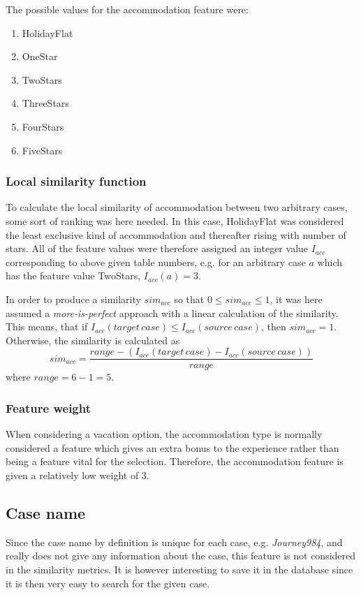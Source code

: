 \documentclass[12pt]{article}
\begin{document}
The possible values for the accommodation feature were: 

\begin{enumerate}
\item HolidayFlat
\item OneStar
\item TwoStars
\item ThreeStars
\item FourStars
\item FiveStars
\end{enumerate}

\subsubsection{Local similarity function}

To calculate the local similarity of accommodation between two arbitrary cases, some sort of ranking was here needed. 
In this case, HolidayFlat was considered the least exclusive kind of accommodation and thereafter rising with number of stars. All of the feature values were therefore assigned an integer value $I_{acc}$ corresponding to above given table numbers, e.g. for an arbitrary case $a$ which has the feature value TwoStars, $I_{acc}(a)=3$. 

In order to produce a similarity $sim_{acc}$ so that $0 \leq sim_{acc} \leq 1$, it was here assumed a \textit{more-is-perfect} approach with a linear calculation of the similarity. This means, that if $I_{acc}(target\,case) \leq I_{acc}(source\,case)$, then $sim_{acc}=1$. Otherwise, the similarity is calculated as $$sim_{acc}=\frac{range-(I_{acc}(target\,case)-I_{acc}(source\,case))}{range}$$
where $range=6-1=5$.

\subsubsection{Feature weight}

When considering a vacation option, the accommodation type is normally considered a feature which gives an extra bonus to the experience rather than being a feature vital for the selection. Therefore, the accommodation feature is given a relatively low weight of 3. 

\subsection{Case name}

Since the case name by definition is unique for each case, e.g. \textit{Journey984}, and really does not give any information about the case, this feature is not considered in the similarity metrics. It is however interesting to save it in the database since it is then very easy to search for the given case.
\end{document}
